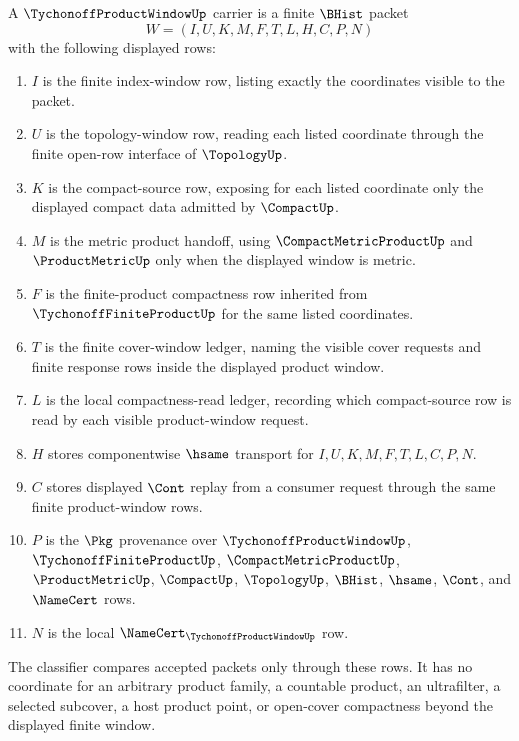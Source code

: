 \begin{definition}
\label{def:tychonoff-product-window-carrier}
A $\TychonoffProductWindowUp$ carrier is a finite $\BHist$ packet
$$
W=(I,U,K,M,F,T,L,H,C,P,N)
$$
with the following displayed rows:
\begin{enumerate}
\item $I$ is the finite index-window row, listing exactly the coordinates visible to the packet.
\item $U$ is the topology-window row, reading each listed coordinate through the finite open-row interface of $\TopologyUp$.
\item $K$ is the compact-source row, exposing for each listed coordinate only the displayed compact data admitted by $\CompactUp$.
\item $M$ is the metric product handoff, using $\CompactMetricProductUp$ and $\ProductMetricUp$ only when the displayed window is metric.
\item $F$ is the finite-product compactness row inherited from $\TychonoffFiniteProductUp$ for the same listed coordinates.
\item $T$ is the finite cover-window ledger, naming the visible cover requests and finite response rows inside the displayed product window.
\item $L$ is the local compactness-read ledger, recording which compact-source row is read by each visible product-window request.
\item $H$ stores componentwise $\hsame$ transport for $I,U,K,M,F,T,L,C,P,N$.
\item $C$ stores displayed $\Cont$ replay from a consumer request through the same finite product-window rows.
\item $P$ is the $\Pkg$ provenance over $\TychonoffProductWindowUp$, $\TychonoffFiniteProductUp$, $\CompactMetricProductUp$, $\ProductMetricUp$, $\CompactUp$, $\TopologyUp$, $\BHist$, $\hsame$, $\Cont$, and $\NameCert$ rows.
\item $N$ is the local $\NameCert_{\TychonoffProductWindowUp}$ row.
\end{enumerate}
The classifier compares accepted packets only through these rows. It has no coordinate for an arbitrary product family, a countable product, an ultrafilter, a selected subcover, a host product point, or open-cover compactness beyond the displayed finite window.
\end{definition}

